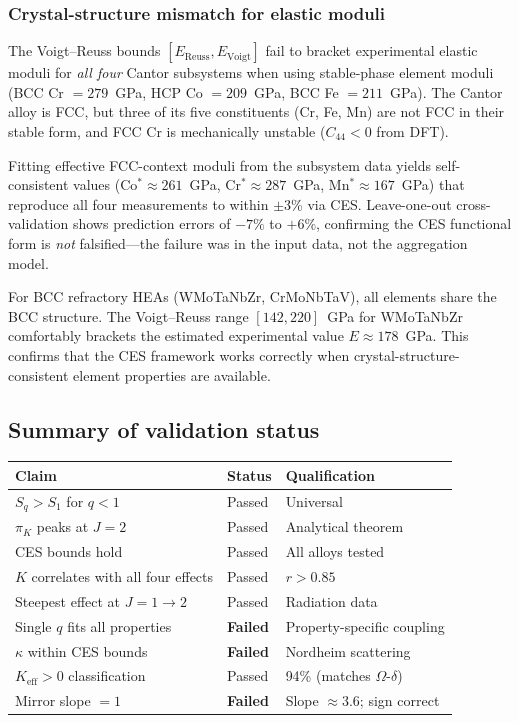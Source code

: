 \documentclass[12pt,letterpaper]{article}
\theoremstyle{definition}
\begin{document}
\subsubsection{Crystal-structure mismatch for elastic moduli}

The Voigt--Reuss bounds $[E_{\mathrm{Reuss}}, E_{\mathrm{Voigt}}]$ fail to bracket experimental elastic moduli for \emph{all four} Cantor subsystems when using stable-phase element moduli (BCC Cr $= 279$~GPa, HCP Co $= 209$~GPa, BCC Fe $= 211$~GPa).  The Cantor alloy is FCC, but three of its five constituents (Cr, Fe, Mn) are not FCC in their stable form, and FCC Cr is mechanically unstable ($C_{44} < 0$ from DFT).

Fitting effective FCC-context moduli from the subsystem data yields self-consistent values (Co$^* \approx 261$~GPa, Cr$^* \approx 287$~GPa, Mn$^* \approx 167$~GPa) that reproduce all four measurements to within $\pm$3\% via CES.  Leave-one-out cross-validation shows prediction errors of $-7\%$ to $+6\%$, confirming the CES functional form is \emph{not} falsified---the failure was in the input data, not the aggregation model.

For BCC refractory HEAs (WMoTaNbZr, CrMoNbTaV), all elements share the BCC structure.  The Voigt--Reuss range $[142, 220]$~GPa for WMoTaNbZr comfortably brackets the estimated experimental value $E \approx 178$~GPa.  This confirms that the CES framework works correctly when crystal-structure-consistent element properties are available.

\subsection{Summary of validation status}

\begin{center}
\begin{tabular}{@{}lll@{}}
\toprule
\textbf{Claim} & \textbf{Status} & \textbf{Qualification} \\
\midrule
$S_q > S_1$ for $q < 1$ & Passed & Universal \\
$\pi_K$ peaks at $J = 2$ & Passed & Analytical theorem \\
CES bounds hold & Passed & All alloys tested \\
$K$ correlates with all four effects & Passed & $r > 0.85$ \\
Steepest effect at $J = 1 \to 2$ & Passed & Radiation data \\
Single $q$ fits all properties & \textbf{Failed} & Property-specific coupling \\
$\kappa$ within CES bounds & \textbf{Failed} & Nordheim scattering \\
$K_{\mathrm{eff}} > 0$ classification & Passed & 94\% (matches $\Omega$-$\delta$) \\
Mirror slope $= 1$ & \textbf{Failed} & Slope $\approx 3.6$; sign correct \\
\bottomrule
\end{tabular}
\end{center}
\end{document}
